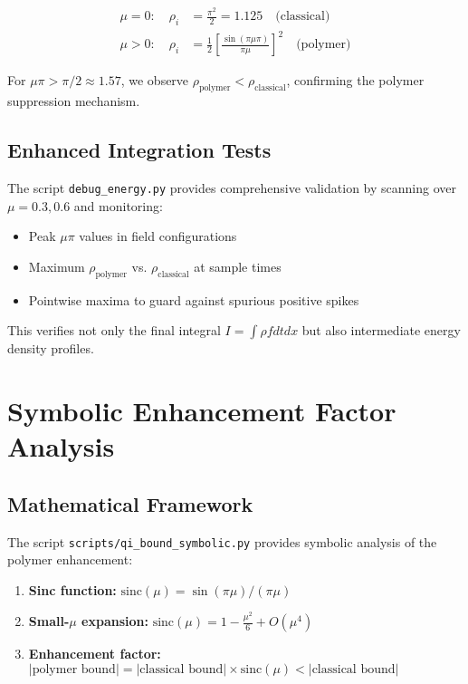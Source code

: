 \documentclass[11pt]{article}
\begin{document}
\begin{align}
\mu = 0: \quad \rho_i &= \frac{\pi^2}{2} = 1.125 \quad \text{(classical)} \\
\mu > 0: \quad \rho_i &= \frac{1}{2}\left[\frac{\sin(\pi\mu\pi)}{\pi\mu}\right]^2 \quad \text{(polymer)}
\end{align}

For $\mu\pi > \pi/2 \approx 1.57$, we observe $\rho_{\text{polymer}} < \rho_{\text{classical}}$, confirming the polymer suppression mechanism.

\subsection{Enhanced Integration Tests}
The script \texttt{debug\_energy.py} provides comprehensive validation by scanning over $\mu = 0.3, 0.6$ and monitoring:
\begin{itemize}
\item Peak $\mu\pi$ values in field configurations
\item Maximum $\rho_{\text{polymer}}$ vs. $\rho_{\text{classical}}$ at sample times
\item Pointwise maxima to guard against spurious positive spikes
\end{itemize}

This verifies not only the final integral $I = \int\rho f dt dx$ but also intermediate energy density profiles.

\section{Symbolic Enhancement Factor Analysis}

\subsection{Mathematical Framework}
The script \texttt{scripts/qi\_bound\_symbolic.py} provides symbolic analysis of the polymer enhancement:

\begin{enumerate}
\item \textbf{Sinc function:} $\text{sinc}(\mu) = \sin(\pi\mu)/(\pi\mu)$
\item \textbf{Small-$\mu$ expansion:} $\text{sinc}(\mu) = 1 - \frac{\mu^2}{6} + O(\mu^4)$
\item \textbf{Enhancement factor:} $|\text{polymer bound}| = |\text{classical bound}| \times \text{sinc}(\mu) < |\text{classical bound}|$
\end{enumerate}
\end{document}
